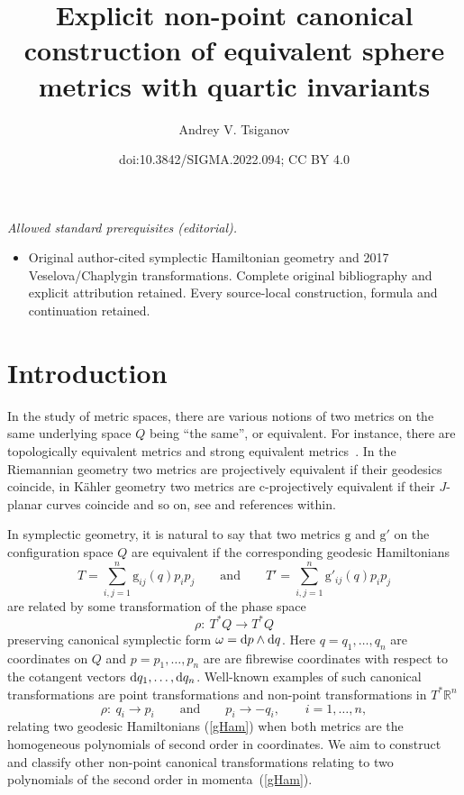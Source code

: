 \documentclass[10pt,a4paper]{amsart}
\title{Explicit non-point canonical construction of equivalent sphere metrics with quartic invariants}
\author{Andrey V. Tsiganov}
\date{doi:10.3842/SIGMA.2022.094; CC BY 4.0}
\numberwithin{equation}{section}
\begin{document}
\maketitle
\noindent\textit{Allowed standard prerequisites (editorial).}\begin{itemize}
\item Original author-cited symplectic Hamiltonian geometry and 2017 Veselova/Chaplygin transformations. Complete original bibliography and explicit attribution retained. Every source-local construction, formula and continuation retained.
\end{itemize}\medskip
\section{Introduction}

In the study of metric spaces, there are various notions of two metrics on the same underlying space $Q$ being ``the same'', or equivalent. For instance, there are topologically equivalent metrics and strong equivalent metrics~\cite{bish80}. In the Riemannian geometry two metrics are projectively equivalent if their geodesics coincide, in K\"ahler geometry two metrics are c-projectively equivalent if their $J$-planar curves coincide and so on, see \cite{kiy11,mat20,tab84} and references within.

In symplectic geometry, it is natural to say that two metrics $\mathrm g$ and $\mathrm g'$ on the configuration space $Q$ are equivalent if the corresponding geodesic Hamiltonians
\begin{equation} \label{gHam}
T=\sum_{i,j=1}^n \mathrm g_{ij}(q) p_ip_j\qquad \mbox{and}\qquad
T'=\sum_{i,j=1}^n \mathrm g'_{ij}(q) p_ip_j
\end{equation}
are related by some transformation of the phase space
\begin{equation}\label{g-trans}
\rho\colon \  T^*Q\to T^*Q
\end{equation}
preserving canonical symplectic form $\omega={\rm d}p\wedge {\rm d}q$. Here $q=q_1,\dots,q_n$ are coordinates on $Q$ and $p=p_1,\dots,p_n$ are
are fibrewise coordinates with respect to the cotangent vectors ${\rm d}q_1,\dots,{\rm d}q_n$.
Well-known examples of such canonical transformations are point transformations and non-point transformations in $T^*{\mathbb R}^n$
\[
\rho\colon \ q_i\to p_i\qquad\mbox{and}\qquad p_i\to -q_i ,\qquad i=1,\dots,n ,
\]
relating two geodesic Hamiltonians (\ref{gHam}) when both metrics are the homogeneous polynomials of second order in coordinates.
We aim to construct and classify other non-point canonical transformations relating to two polynomials of the second order in momenta~(\ref{gHam}).
\end{document}

